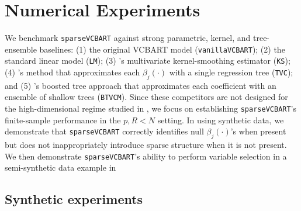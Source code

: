 \documentclass[11pt]{article}
\theoremstyle{plain}
\theoremstyle{definition}
\theoremstyle{plain}
\begin{document}



\section{Numerical Experiments}
\label{sec:experiments}
We benchmark \texttt{sparseVCBART} against strong parametric, kernel, and tree-ensemble baselines: (1) the original VCBART model (\texttt{vanillaVCBART}); (2) the standard linear model (\texttt{LM}); (3) \citet{LiRacine2010}'s multivariate kernel-smoothing estimator (\texttt{KS}); (4) \citet{Burgin2017}'s method that approximates each $\beta_{j}(\cdot)$ with a single regression tree (\texttt{TVC}); and (5) \citet{ZhouHooker2022}'s boosted tree approach that approximates each coefficient with an ensemble of shallow trees (\texttt{BTVCM}).
Since these competitors are not designed for the high-dimensional regime studied in , we focus on establishing \texttt{sparseVCBART}'s finite-sample performance in the $p,R  < N$ setting.
In  using synthetic data, we demonstrate that \texttt{sparseVCBART} correctly identifies null $\beta_{j}(\cdot)$'s when present but does not inappropriately introduce sparse structure when it is not present. 
We then demonstrate \texttt{sparseVCBART}'s ability to perform variable selection in a semi-synthetic data example in 

\subsection{Synthetic experiments}
\label{sec:synthetic-experiments}
\end{document}

